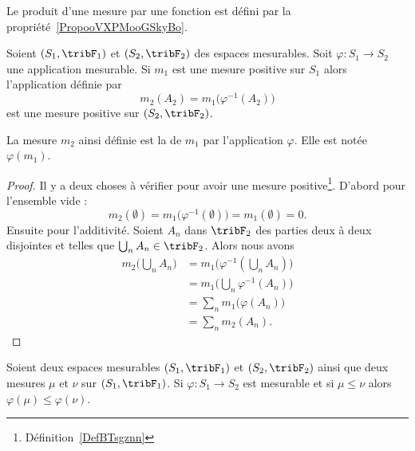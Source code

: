 Le produit d'une mesure par une fonction est défini par la propriété~\ref{PropooVXPMooGSkyBo}.

\begin{propositionDef}     \label{PropJCJQooAdqrGA}
    Soient \( (S_1,\tribF_1)\) et \( (S_2,\tribF_2)\) des espaces mesurables. Soit \( \varphi\colon S_1\to S_2\) une application mesurable. Si \( m_1\) est une mesure positive sur \( S_1\) alors l'application définie par
    \begin{equation}
        m_2(A_2)=m_1\big( \varphi^{-1}(A_2) \big)
    \end{equation}
    est une mesure positive sur \( (S_2,\tribF_2)\).

    La mesure \( m_2\) ainsi définie est la  de \( m_1\) par l'application \( \varphi\). Elle est notée \( \varphi(m_1)\).
\end{propositionDef}

\begin{proof}
    Il y a deux choses à vérifier pour avoir une mesure positive\footnote{Définition~\ref{DefBTsgznn}}. D'abord pour l'ensemble vide :
    \begin{equation}
        m_2(\emptyset)=m_1\big( \varphi^{-1}(\emptyset) \big)=m_1(\emptyset)=0.
    \end{equation}
    Ensuite pour l'additivité. Soient \( A_n\) dans \( \tribF_2\) des parties deux à deux disjointes et telles que \( \bigcup_nA_n\in\tribF_2\). Alors nous avons
    \begin{subequations}
        \begin{align}
      m_2\big( \bigcup_nA_n \big) & =m_1\Big( \varphi^{-1}(\bigcup_nA_n) \Big)  \\
                                  & =m_1\big( \bigcup_n\varphi^{-1}(A_n) \big)  \\
                                  & =\sum_nm_1\big( \varphi(A_n) \big)          \\
                                  & =\sum_nm_2(A_n).
        \end{align}
    \end{subequations}
\end{proof}

\begin{lemma}
    Soient deux espaces mesurables \( (S_1,\tribF_1)\) et \( (S_2,\tribF_2)\) ainsi que deux mesures \( \mu\) et \( \nu\) sur \( (S_1,\tribF_1)\). Si \( \varphi\colon S_1\to S_2\) est mesurable et si \( \mu\leq \nu\) alors \( \varphi(\mu)\leq \varphi(\nu)\).
\end{lemma}

